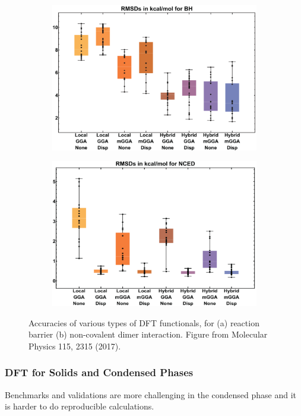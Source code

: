 \documentclass{article}
\theoremstyle{plain}\theoremheaderfont{\normalfont\itshape}\theorembodyfont{\rmfamily}\theoremseparator{.}\newtheorem*{rem}{Remark}\newtheorem*{ex}{Example}\newtheorem*{proof}{Proof}\newtheorem*{altp}{Alternative proof}
\theoremstyle{plain}\theoremheaderfont{\normalfont\bfseries}\theorembodyfont{\rmfamily}\theoremseparator{.}\newtheorem{thm}{Theorem}[section]\newtheorem{lem}[thm]{Lemma}\newtheorem{prop}[thm]{Proposition}\newtheorem*{cor}{Corollary}\newtheorem{defn}[thm]{Definition}\newtheorem{clm}[thm]{Claim}\newtheorem{clminproof}{Claim}\newtheorem{pos}{Postulate}[section]
\theoremstyle{break}\theoremheaderfont{\normalfont\itshape}\theorembodyfont{\rmfamily}\theoremseparator{.\medskip}\newtheorem*{proofskip}{Proof}\newtheorem*{exs}{Examples}\newtheorem*{rems}{Remarks}
\theoremstyle{break}\theoremheaderfont{\normalfont\bfseries}\theorembodyfont{\rmfamily}\theoremseparator{.\medskip}\newtheorem{lemskip}[thm]{Lemma}\newtheorem{defnskip}[thm]{Definition}\newtheorem{propskip}[thm]{Proposition}\newtheorem{thmskip}[thm]{Theorem}
\numberwithin{equation}{section}
\begin{document}
    \begin{figure}
        \centering
        \begin{subfigure}{.5\textwidth}
          \centering
          \includegraphics[width=.9\linewidth]{barrier_acc.png}
        \end{subfigure}%
        \begin{subfigure}{.5\textwidth}
          \centering
          \includegraphics[width=.9\linewidth]{dimer_acc.png}
        \end{subfigure}
        \caption{Accuracies of various types of DFT functionals, for (a) reaction barrier (b) non-covalent dimer interaction. Figure from Molecular Physics 115, 2315 (2017).}
    \end{figure}

    \subsubsection{DFT for Solids and Condensed Phases}
    Benchmarks and validations are more challenging in the condensed phase and it is harder to do reproducible calculations.
\end{document}
